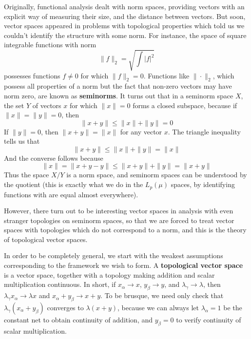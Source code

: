 Originally, functional analysis dealt with norm spaces, providing vectors with an explicit way of measuring their size, and the distance between vectors. But soon, vector spaces appeared in problems with topological properties which told us we couldn't identify the structure with some norm. For instance, the space of square integrable functions with norm
%
\[ \| f \|_2 = \sqrt{\int |f|^2} \]
%
possesses functions $f \neq 0$ for which $\| f \|_2 = 0$. Functions like $\| \cdot \|_2$, which possess all properties of a norm but the fact that non-zero vectors may have norm zero, are known as {\bf seminorms}. It turns out that in a seminorm space $X$, the set $Y$ of vectors $x$ for which $\| x \| = 0$ forms a closed subspace, because if $\| x \| = \| y \| = 0$, then
%
\[ \| x + y \| \leq \| x \| + \| y \| = 0 \]
%
If $\| y \| = 0$, then $\| x + y \| = \| x \|$ for any vector $x$. The triangle inequality tells us that
%
\[ \| x + y \| \leq \| x \| + \| y \| = \| x \| \]
%
And the converse follows because
%
\[ \| x \| = \| x + y - y \| \leq \| x + y \| + \| y \| = \| x + y \| \]
%
Thus the space $X/Y$ is a norm space, and seminorm spaces can be understood by the quotient (this is exactly what we do in the $L_p(\mu)$ spaces, by identifying functions with are equal almost everywhere).

However, there turn out to be interesting vector spaces in analysis with even stranger topologies on seminorm spaces, so that we are forced to treat vector spaces with topologies which do not correspond to a norm, and this is the theory of topological vector spaces.

In order to be completely general, we start with the weakest assumptions corresponding to the framework we wish to form. A {\bf topological vector space} is a vector space, together with a topology making addition and scalar multiplication continuous. In short, if $x_\alpha \to x$, $y_\beta \to y$, and $\lambda_\gamma \to \lambda$, then $\lambda_\gamma x_\alpha \to \lambda x$ and $x_\alpha + y_\beta \to x + y$. To be brusque, we need only check that $\lambda_\gamma (x_\alpha + y_\beta)$ converges to $\lambda (x + y)$, because we can always let $\lambda_\alpha = 1$ be the constant net to obtain continuity of addition, and $y_\beta = 0$ to verify continuity of scalar multiplication.

